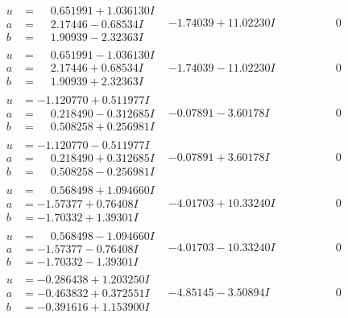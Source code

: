 \documentclass[1p]{elsarticle_modified}
\theoremstyle{definition}
\begin{document}
$$\begin{array}{c|c|c}
\begin{aligned}
u &= \phantom{-}0.651991 + 1.036130 I \\
a &= \phantom{-}2.17446 - 0.68534 I \\
b &= \phantom{-}1.90939 - 2.32363 I\end{aligned}
 & -1.74039 + 11.02230 I & \phantom{-0.000000 } 0 \\ \hline\begin{aligned}
u &= \phantom{-}0.651991 - 1.036130 I \\
a &= \phantom{-}2.17446 + 0.68534 I \\
b &= \phantom{-}1.90939 + 2.32363 I\end{aligned}
 & -1.74039 - 11.02230 I & \phantom{-0.000000 } 0 \\ \hline\begin{aligned}
u &= -1.120770 + 0.511977 I \\
a &= \phantom{-}0.218490 - 0.312685 I \\
b &= \phantom{-}0.508258 + 0.256981 I\end{aligned}
 & -0.07891 - 3.60178 I & \phantom{-0.000000 } 0 \\ \hline\begin{aligned}
u &= -1.120770 - 0.511977 I \\
a &= \phantom{-}0.218490 + 0.312685 I \\
b &= \phantom{-}0.508258 - 0.256981 I\end{aligned}
 & -0.07891 + 3.60178 I & \phantom{-0.000000 } 0 \\ \hline\begin{aligned}
u &= \phantom{-}0.568498 + 1.094660 I \\
a &= -1.57377 + 0.76408 I \\
b &= -1.70332 + 1.39301 I\end{aligned}
 & -4.01703 + 10.33240 I & \phantom{-0.000000 } 0 \\ \hline\begin{aligned}
u &= \phantom{-}0.568498 - 1.094660 I \\
a &= -1.57377 - 0.76408 I \\
b &= -1.70332 - 1.39301 I\end{aligned}
 & -4.01703 - 10.33240 I & \phantom{-0.000000 } 0 \\ \hline\begin{aligned}
u &= -0.286438 + 1.203250 I \\
a &= -0.463832 + 0.372551 I \\
b &= -0.391616 + 1.153900 I\end{aligned}
 & -4.85145 - 3.50894 I & \phantom{-0.000000 } 0 \\ \hline\begin{aligned}

\end{aligned}
\end{array}$$
\end{document}
